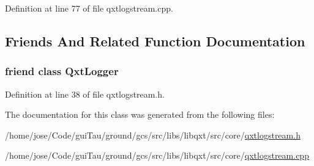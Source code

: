 Definition at line 77 of file qxtlogstream.\-cpp.



\subsection{Friends And Related Function Documentation}
\hypertarget{class_qxt_log_stream_a8ad721e58be5d2c7fb399e38f2a07a2c}{
\subsubsection[{Qxt\-Logger}]{\setlength{\rightskip}{0pt plus 5cm}friend class {\bf Qxt\-Logger}\hspace{0.3cm}{\ttfamily [friend]}}}\label{class_qxt_log_stream_a8ad721e58be5d2c7fb399e38f2a07a2c}


Definition at line 38 of file qxtlogstream.\-h.



The documentation for this class was generated from the following files\-:\begin{DoxyCompactItemize}
\item 
/home/jose/\-Code/gui\-Tau/ground/gcs/src/libs/libqxt/src/core/\hyperlink{qxtlogstream_8h}{qxtlogstream.\-h}\item 
/home/jose/\-Code/gui\-Tau/ground/gcs/src/libs/libqxt/src/core/\hyperlink{qxtlogstream_8cpp}{qxtlogstream.\-cpp}\end{DoxyCompactItemize}

